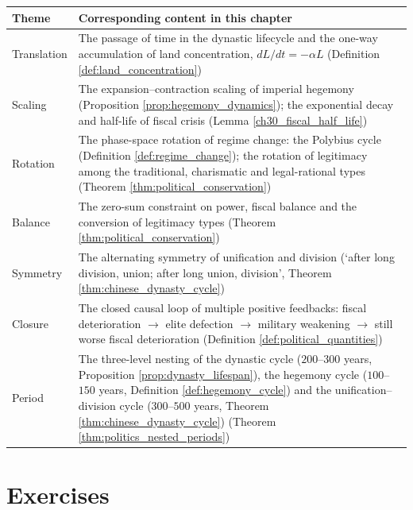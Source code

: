 \begin{center}
\begin{tabular}{>{\centering\arraybackslash}p{2.8cm}>{\centering\arraybackslash}p{9.9cm}}
\toprule
Theme & Corresponding content in this chapter \\
\midrule
Translation & The passage of time in the dynastic lifecycle and the one-way accumulation of land concentration, $dL/dt = -\alpha L$ (Definition \ref{def:land_concentration}) \\
Scaling & The expansion--contraction scaling of imperial hegemony (Proposition \ref{prop:hegemony_dynamics}); the exponential decay and half-life of fiscal crisis (Lemma \ref{ch30_fiscal_half_life}) \\
Rotation & The phase-space rotation of regime change: the Polybius cycle (Definition \ref{def:regime_change}); the rotation of legitimacy among the traditional, charismatic and legal-rational types (Theorem \ref{thm:political_conservation}) \\
Balance & The zero-sum constraint on power, fiscal balance and the conversion of legitimacy types (Theorem \ref{thm:political_conservation}) \\
Symmetry & The alternating symmetry of unification and division (`after long division, union; after long union, division', Theorem \ref{thm:chinese_dynasty_cycle}) \\
Closure & The closed causal loop of multiple positive feedbacks: fiscal deterioration $\to$ elite defection $\to$ military weakening $\to$ still worse fiscal deterioration (Definition \ref{def:political_quantities}) \\
Period & The three-level nesting of the dynastic cycle ($200$--$300$ years, Proposition \ref{prop:dynasty_lifespan}), the hegemony cycle ($100$--$150$ years, Definition \ref{def:hegemony_cycle}) and the unification--division cycle ($300$--$500$ years, Theorem \ref{thm:chinese_dynasty_cycle}) (Theorem \ref{thm:politics_nested_periods}) \\
\bottomrule
\end{tabular}
\end{center}

\section*{Exercises}

